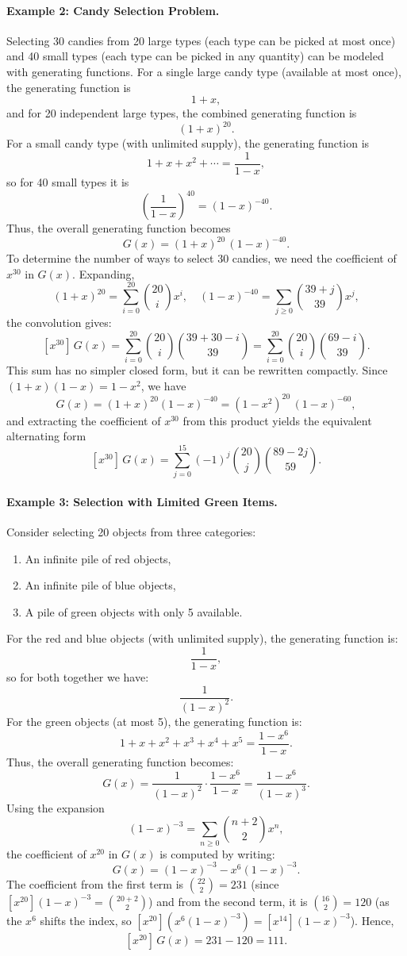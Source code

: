 \documentclass[docmute]{article}
\begin{document}
\paragraph{Example 2: Candy Selection Problem.}
Selecting 30 candies from 20 large types (each type can be picked at most once) and 40 small types (each type can be picked in any quantity) can be modeled with generating functions. For a single large candy type (available at most once), the generating function is 
\[
1+x,
\]
and for 20 independent large types, the combined generating function is
\[
(1+x)^{20}.
\]
For a small candy type (with unlimited supply), the generating function is 
\[
1+x+x^2+\cdots = \frac{1}{1-x},
\]
so for 40 small types it is
\[
\left(\frac{1}{1-x}\right)^{40}=(1-x)^{-40}.
\]
Thus, the overall generating function becomes
\[
G(x) = (1+x)^{20}\,(1-x)^{-40}.
\]
To determine the number of ways to select 30 candies, we need the coefficient of \(x^{30}\) in \(G(x)\). Expanding,
\[
(1+x)^{20} = \sum_{i=0}^{20}\binom{20}{i}x^i, \quad (1-x)^{-40} = \sum_{j\ge0}\binom{39+j}{39}x^j,
\]
the convolution gives:
\[
[x^{30}]\,G(x)=\sum_{i=0}^{20}\binom{20}{i}\binom{39+30-i}{39}
=\sum_{i=0}^{20}\binom{20}{i}\binom{69-i}{39}.
\]
This sum has no simpler closed form, but it can be rewritten compactly.  Since
\((1+x)(1-x) = 1-x^2\), we have
\[
G(x) = (1+x)^{20}(1-x)^{-40} = (1-x^2)^{20}\,(1-x)^{-60},
\]
and extracting the coefficient of \(x^{30}\) from this product yields the equivalent
alternating form
\[
[x^{30}]\,G(x)=\sum_{j=0}^{15}(-1)^j\binom{20}{j}\binom{89-2j}{59}.
\]

\bigskip

\paragraph{Example 3: Selection with Limited Green Items.}
Consider selecting 20 objects from three categories:
\begin{enumerate}
    \item An infinite pile of red objects,
    \item An infinite pile of blue objects,
    \item A pile of green objects with only 5 available.
\end{enumerate}
For the red and blue objects (with unlimited supply), the generating function is:
\[
\frac{1}{1-x},
\]
so for both together we have:
\[
\frac{1}{(1-x)^2}.
\]
For the green objects (at most 5), the generating function is:
\[
1+x+x^2+x^3+x^4+x^5 = \frac{1-x^6}{1-x}.
\]
Thus, the overall generating function becomes:
\[
G(x)=\frac{1}{(1-x)^2}\cdot\frac{1-x^6}{1-x}=\frac{1-x^6}{(1-x)^3}.
\]
Using the expansion
\[
(1-x)^{-3}=\sum_{n\ge0}\binom{n+2}{2}x^n,
\]
the coefficient of \(x^{20}\) in \(G(x)\) is computed by writing:
\[
G(x)= (1-x)^{-3} - x^6(1-x)^{-3}.
\]
The coefficient from the first term is \(\binom{22}{2}=231\) (since \([x^{20}](1-x)^{-3}=\binom{20+2}{2}\)) and from the second term, it is \(\binom{16}{2}=120\) (as the \(x^6\) shifts the index, so \([x^{20}](x^6(1-x)^{-3})=[x^{14}](1-x)^{-3}\)). Hence,
\[
[x^{20}]\,G(x)=231-120=111.
\]
\end{document}

